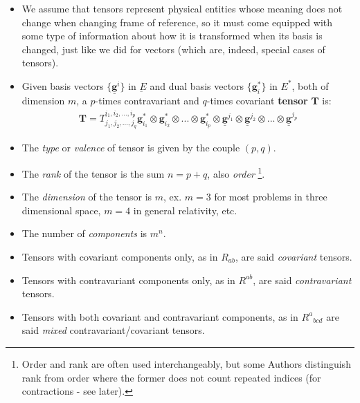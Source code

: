 \documentclass{digitaldynamics}
\def\vcovar#1{{\bm{#1}}^*}
\def\vcontr#1{\underline{\bm{#1}}}
\def\tensor#1{\bm{#1}}
\begin{document}
\begin{itemize}
 
	\item We assume that tensors represent physical entities whose meaning does not change when changing frame of reference, so it
	must come equipped with some type of information about how it is transformed when its basis is changed, just like we did for vectors (which are, indeed, special cases of tensors).
	
	\item Given basis vectors $\{\vcontr{g}^i\}$ in $\underbar{E}$ and  dual basis vectors $\{\vcovar{g}_{i}\}$ in $E^*$, both of dimension $m$, a $p$-times contravariant and $q$-times covariant \textbf{tensor} $\tensor{T}$ is:
	\begin{align*}
  \tensor{T} = T^{i_1, i_2, ..., i_p}_{j_1, j_2, ..., j_q} 
	\vcovar{g}_{i_1} \otimes \vcovar{g}_{i_2} \otimes ... \otimes \vcovar{g}_{i_p} \otimes 
	\vcontr{g}^{j_1} \otimes \vcontr{g}^{j_2} \otimes ... \otimes \vcontr{g}^{j_p}
	\end{align*}
	
	\item  The \textit{type} or \textit{valence} of tensor is given by the couple $(p,q)$.
	
	\item  The \textit{rank} of the tensor is the sum $n=p+q$, also \textit{order} \footnote{Order and rank are often used interchangeably, but some Authors distinguish rank from order where the former does not count repeated indices (for contractions - see later).}.
	
	\item  The \textit{dimension} of the tensor is $m$, ex. $m=3$ for most problems in three dimensional space, $m=4$ in general relativity, etc.
	
	\item  The number of \textit{components} is $m^n$.
	
	\item Tensors with covariant components only, as in $R_{a b}$, are said \textit{covariant} tensors.
	
	\item Tensors with contravariant components only, as in $R^{a b}$, are said \textit{contravariant} tensors.
	
	\item Tensors with both covariant and contravariant components, as in $R^a{}_{b c d}$ are said \textit{mixed} contravariant/covariant tensors.
	

\end{itemize}
\end{document}
